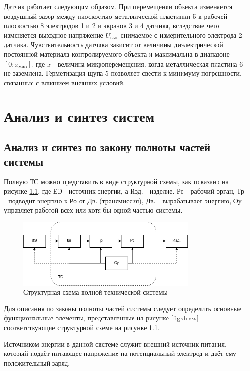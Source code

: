 Датчик работает следующим образом. При перемещении объекта изменяется воздушный зазор между плоскостью металлической пластинки 5 и рабочей плоскостью 8 электродов 1 и 2 и экранов 3 и 4 датчика, вследствие чего изменяется выходное напряжение $U_{\text{вых}}$ снимаемое с измерительного электрода 2 датчика. Чувствительность датчика зависит от величины диэлектрической постоянной материала контролируемого объекта и максимальна в диапазоне $[0 : x_{\text{мин}}]$, где $x$ - величина микроперемещения, когда металлическая пластина 6 не заземлена. Герметизация щупа 5 позволяет свести к минимуму погрешности, связанные с влиянием внешних условий.

\chapter{Анализ и синтез систем}
\label{cha:analis0}

\section{Анализ и синтез по закону полноты частей системы}

Полную ТС можно представить в виде структурной схемы, как показано на рисунке \ref{fig:analysis1_example}, где ЕЭ - источник энергии, а Изд. - изделие. Ро - рабочий орган, Тр - подводит энергию к Ро от Дв. (трансмиссия), Дв. - вырабатывает энергию, Оу - управляет работой всех или хотя бы одной частью системы. \cite{metodichka}

\begin{figure}
    \centering
    \includegraphics[width=0.8\textwidth]{graphics/img/analys1_example.png}
    \caption{Структурная схема полной технической системы}
    \label{fig:analysis1_example}
\end{figure}

Для описания по законы полноты частей системы следует определить основные функциональные элементы, представленные на рисунке \ref{fig:draw} соответствующие структурной схеме на рисунке \ref{fig:analysis1_example}.

Источником энергии в данной системе служит внешний источник питания, который подаёт питающее напряжение на потенциальный электрод и даёт ему положительный заряд.

